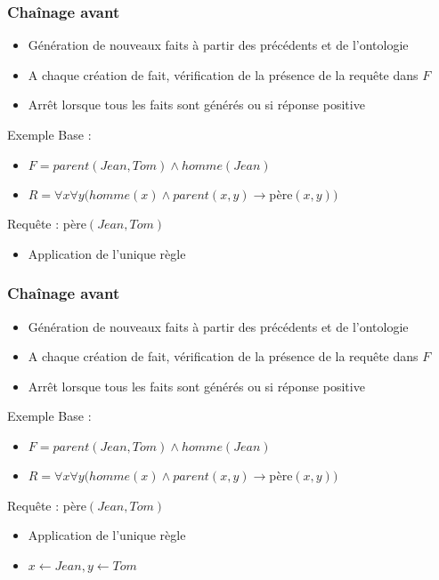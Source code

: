\begin{frame}
	\frametitle{Chaînage avant}
	\begin{itemize}
		\item Génération de nouveaux faits à partir des précédents et de l'ontologie
		\item A chaque création de fait, vérification de la présence de la requête dans
		$F$
		\item Arrêt lorsque tous les faits sont générés ou si réponse positive
	\end{itemize}

	\begin{exampleblock}{Exemple}
	Base :
	\begin{itemize}
		\item $F = parent(Jean,Tom) \wedge homme(Jean)$
		\item $R = \forall x \forall y (homme(x) \wedge parent(x,y) \rightarrow
		$père$(x,y))$
	\end{itemize}
	Requête : père$(Jean,Tom)$
	\begin{itemize}
		\item Application de l'unique règle
	\end{itemize}
	\end{exampleblock}
\end{frame}


\begin{frame}
	\frametitle{Chaînage avant}
	\begin{itemize}
		\item Génération de nouveaux faits à partir des précédents et de l'ontologie
		\item A chaque création de fait, vérification de la présence de la requête dans
		$F$
		\item Arrêt lorsque tous les faits sont générés ou si réponse positive
	\end{itemize}

	\begin{exampleblock}{Exemple}
	Base :
	\begin{itemize}
		\item $F = parent(Jean,Tom) \wedge homme(Jean)$
		\item $R = \forall x \forall y (homme(x) \wedge parent(x,y) \rightarrow
		$père$(x,y))$
	\end{itemize}
	Requête : père$(Jean,Tom)$
	\begin{itemize}
		\item Application de l'unique règle
		\item $x \leftarrow Jean, y \leftarrow Tom$
	\end{itemize}
	\end{exampleblock}
\end{frame}


